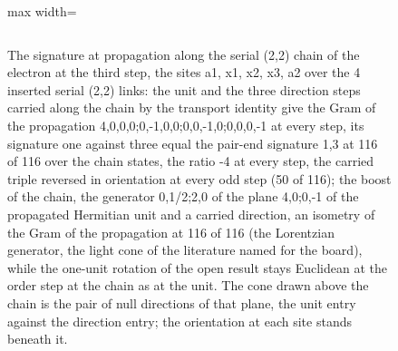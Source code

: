 \begin{figure}[htbp]
{\begin{adjustbox}{max width=\linewidth}
\begin{tabular}{llllll}
\end{tabular}\end{adjustbox}}
\caption{The signature at propagation along the serial (2,2) chain of the electron at the third step, the sites a1, x1, x2, x3, a2 over the 4 inserted serial (2,2) links: the unit and the three direction steps carried along the chain by the transport identity give the Gram of the propagation 4,0,0,0;0,-1,0,0;0,0,-1,0;0,0,0,-1 at every step, its signature one against three equal the pair-end signature 1,3 at 116 of 116 over the chain states, the ratio -4 at every step, the carried triple reversed in orientation at every odd step (50 of 116); the boost of the chain, the generator 0,1/2;2,0 of the plane 4,0;0,-1 of the propagated Hermitian unit and a carried direction, an isometry of the Gram of the propagation at 116 of 116 (the Lorentzian generator, the light cone of the literature named for the board), while the one-unit rotation of the open result stays Euclidean at the order step at the chain as at the unit. The cone drawn above the chain is the pair of null directions of that plane, the unit entry against the direction entry; the orientation at each site stands beneath it.}\label{fig:III-3-D543402-causal-cone}
\end{figure}

